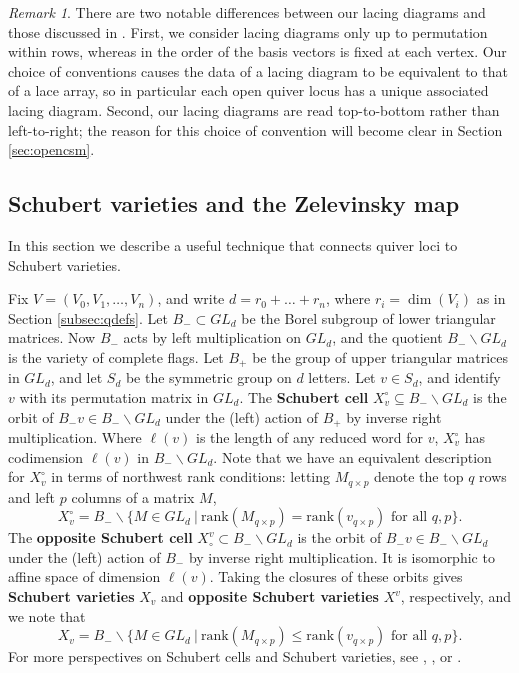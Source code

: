 \documentclass[reqno]{amsart}
\newcommand{\rank}{\textrm{rank}}
\numberwithin{equation}{section}
\theoremstyle{definition}
\theoremstyle{remark}
\newtheorem{remark}[theorem]{Remark}
\begin{document}
\begin{remark}
There are two notable differences between our lacing diagrams and those discussed in \cite{kms06}. First, we consider lacing diagrams only up to permutation within rows, whereas in \cite{kms06} the order of the basis vectors is fixed at each vertex. Our choice of conventions causes the data of a lacing diagram to be equivalent to that of a lace array, so in particular each open quiver locus has a unique associated lacing diagram. Second, our lacing diagrams are read top-to-bottom rather than left-to-right; the reason for this choice of convention will become clear in Section \ref{sec:opencsm}.
\end{remark}

\subsection{Schubert varieties and the Zelevinsky map}\label{sec:zel}
In this section we describe a useful technique that connects quiver loci to Schubert varieties.

Fix $V=(V_0,V_1,\dots,V_n)$, and write $d=r_0+\dots+r_n$, where $r_i=\dim(V_i)$ as in Section \ref{subsec:qdefs}. Let $B_- \subset GL_d$ be the Borel subgroup of lower triangular matrices. Now $B_-$ acts by left multiplication on $GL_d$, and the quotient $B_- \backslash GL_d$ is the variety of complete flags. Let $B_+$ be the group of upper triangular matrices in $GL_d$, and let $S_d$ be the symmetric group on $d$ letters. Let $v \in S_d$, and identify $v$ with its permutation matrix in $GL_d$. The \textbf{Schubert cell} $X_{v}^\circ \subseteq B_-\backslash GL_d$ is the orbit of $B_- v \in B_-\backslash GL_d$ under the (left) action of $B_+$ by inverse right multiplication. Where $\ell(v)$ is the length of any reduced word for $v$, $X_{v}^\circ$ has codimension $\ell(v)$ in $B_-\backslash GL_d$. Note that we have an equivalent description for $X_{v}^\circ$ in terms of northwest rank conditions: letting $M_{q \times p}$ denote the top $q$ rows and left $p$ columns of a matrix $M$,
\[X_{v}^\circ=B_- \backslash \{M \in GL_d~|~ \rank(M_{q \times p}) = \rank(v_{q \times p}) \textrm{ for all }q,p\}.\]
The \textbf{opposite Schubert cell} $X^{v}_\circ \subset B_-\backslash GL_d$ is the orbit of $B_-v \in B_- \backslash GL_d$ under the (left) action of $B_-$ by inverse right multiplication. It is isomorphic to affine space of dimension $\ell(v)$.
Taking the closures of these orbits gives \textbf{Schubert varieties} $X_v$ and \textbf{opposite Schubert varieties} $X^v$, respectively, and we note that     
\[X_{v}=B_- \backslash \{M \in GL_d~|~ \rank(M_{q \times p}) \leq \rank(v_{q \times p}) \textrm{ for all }q,p\}.\]
For more perspectives on Schubert cells and Schubert varieties, see \cite{bgp25}, \cite{Ful96}, or \cite{gil21}.
\end{document}
